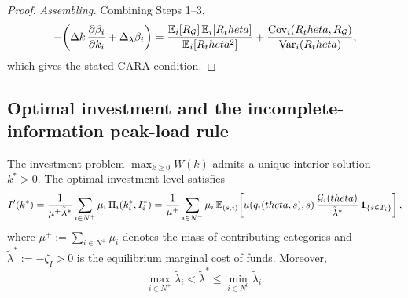 \documentclass[master.tex]{subfiles}
\begin{document}
\begin{proof}
\noindent\textit{Assembling.} Combining Steps 1--3,
\[
-\!\left(
\Delta k\,\frac{\partial\beta_i}{\partial k_i}
+
\Delta_\lambda\beta_i
\right)
=
\frac{\mathbb{E}_i[R_\mathcal{G}]\,\mathbb{E}_i[R_theta]}{\mathbb{E}_i[R_theta^2]}
+
\frac{\mathrm{Cov}_i(R_theta,R_\mathcal{G})}{\mathrm{Var}_i(R_theta)},
\]
which gives the stated CARA condition.
\end{proof}

\subsection{Optimal investment and the incomplete-information peak-load rule}

\begin{lemma}\label{lem:investment}
The investment problem \(\max_{k\geq 0} W(k)\) admits a unique interior solution \(k^\ast > 0\). The optimal investment level satisfies
\[
I'(k^\ast)
= \frac{1}{\mu^+\tilde\lambda^\ast}\sum_{i\in N^+}\mu_i\,\Pi_i(k_i^\ast,I_i^\ast)=
\frac{1}{\mu^+}
\sum_{i\in N^+} \mu_i\,
\mathbb{E}_{(s,i)}\!\left[
u(q_i(theta,s),s)\,
\frac{\mathcal{G}_i(theta)}{\tilde\lambda^\ast}\,
\mathbf{1}_{\{s\in T_i\}}
\right],
\]
where \(\mu^+ := \sum_{i\in N^+}\mu_i\) denotes the mass of contributing categories and \(\tilde\lambda^\ast := -\zeta_I > 0\) is the equilibrium marginal cost of funds. Moreover,
\[
\max_{i \in N^+} \tilde\lambda_i < \tilde\lambda^\ast \leq \min_{i \in N^0} \tilde\lambda_i.
\]
\end{lemma}
\end{document}
